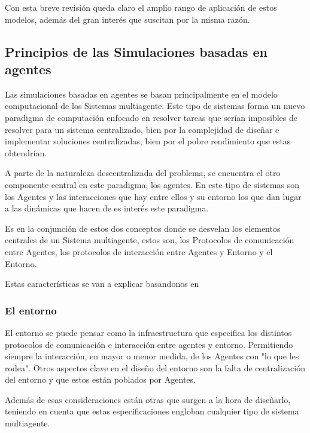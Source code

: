 Con esta breve revisión queda claro el amplio rango de aplicación de estos modelos, además del gran interés que suscitan por la misma razón.

\subsection{Principios de las Simulaciones basadas en agentes}

Las simulaciones basadas en agentes se basan principalmente en el modelo computacional de los Sistemas multiagente. Este tipo de sistemas forma un nuevo paradigma de computación enfocado en resolver tareas que serían imposibles de resolver para un sistema centralizado, bien por la complejidad de diseñar e implementar soluciones centralizadas, bien por el pobre rendimiento que estas obtendrían.

A parte de la naturaleza descentralizada del problema, se encuentra el otro componente central en este paradigma, los agentes. En este tipo de sistemas son los Agentes y las interacciones que hay entre ellos y su entorno los que dan lugar a las dinámicas que hacen de es interés este paradigma.

Es en la conjunción de estos dos conceptos donde se desvelan los elementos centrales de un Sistema multiagente, estos son, los Protocolos de comunicación entre Agentes, los protocolos de interacción entre Agentes y Entorno y el Entorno.

Estas características se van a explicar basandonos en \cite{weiss1999multiagent}

\subsubsection{El entorno}

El entorno se puede pensar como la infraestructura que especifica los distintos protocolos de comunicación e interacción entre agentes y entorno. Permitiendo siempre la interacción, en mayor o menor medida, de los Agentes con "lo que les rodea". Otros aspectos clave en el diseño del entorno son la falta de centralización del entorno y que estos están poblados por Agentes. 

Además de esas consideraciones están otras que surgen a la hora de diseñarlo, teniendo en cuenta que estas especificaciones engloban cualquier tipo de sistema multiagente.

